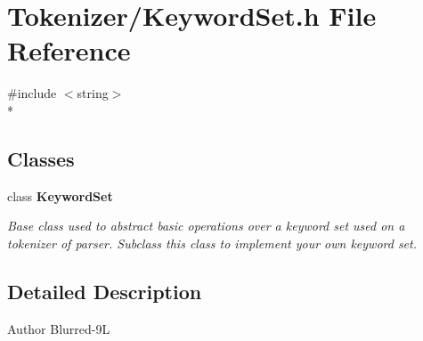 \section{Tokenizer/\-Keyword\-Set.h File Reference}
\label{_keyword_set_8h}
{\ttfamily \#include $<$string$>$}\\*
\subsection*{Classes}
\begin{DoxyCompactItemize}
\item 
class {\bf Keyword\-Set}
\begin{DoxyCompactList}\small\item\em Base class used to abstract basic operations over a keyword set used on a tokenizer of parser. Subclass this class to implement your own keyword set. \end{DoxyCompactList}\end{DoxyCompactItemize}


\subsection{Detailed Description}
\begin{DoxyAuthor}{Author}
Blurred-\/9\-L 
\end{DoxyAuthor}
